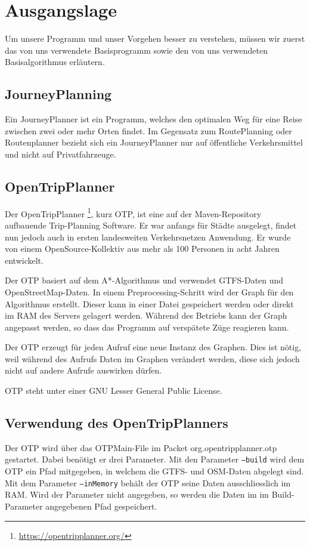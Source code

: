 \section{Ausgangslage}
Um unsere Programm und unser Vorgehen besser zu verstehen, müssen wir zuerst das von uns verwendete Basisprogramm sowie den von uns verwendeten Basisalgorithmus erläutern.

\subsection{JourneyPlanning}
Ein \hypertarget{JourneyPlanner}{JourneyPlanner} ist ein Programm, welches den optimalen Weg für eine Reise zwischen zwei oder mehr Orten findet. Im Gegensatz zum RoutePlanning oder Routenplanner bezieht sich ein JourneyPlanner nur auf öffentliche Verkehrsmittel und nicht auf Privatfahrzeuge.

\subsection{OpenTripPlanner}

Der \hypertarget{OTP}{OpenTripPlanner} \cite{otp}\footnote{\url{https://opentripplanner.org/}}, kurz OTP, ist eine auf der \gls{Maven-Repository} 
aufbauende Trip-Planning Software. Er war anfangs für Städte ausgelegt, findet nun jedoch auch in ersten landesweiten Verkehrsnetzen Anwendung. Er wurde von einem OpenSource-Kollektiv aus mehr als 100 Personen in acht Jahren entwickelt. \newline

Der OTP basiert auf dem A*-Algorithmus und verwendet GTFS-Daten und OpenStreetMap-Daten. In einem Preprocessing-Schritt wird der Graph für den Algorithmus erstellt. Dieser kann in einer Datei gespeichert werden oder direkt im RAM des Servers gelagert werden. Während des Betriebs kann der Graph angepasst werden, so dass das Programm auf verspätete Züge reagieren kann. \newline

Der OTP erzeugt für jeden Aufruf eine neue Instanz des Graphen. Dies ist nötig, weil während des Aufrufs Daten im Graphen verändert werden, diese sich jedoch nicht auf andere Aufrufe auswirken dürfen.

OTP steht unter einer \gls{GNU Lesser General Public License}. 


\subsection{Verwendung des OpenTripPlanners}
Der OTP wird über das OTPMain-File im Packet org.opentripplanner.otp gestartet. Dabei benötigt er drei Parameter. Mit den Parameter \texttt{--build} wird dem OTP ein Pfad mitgegeben, in welchem die GTFS- und OSM-Daten abgelegt sind. Mit dem Parameter \texttt{--inMemory} behält der OTP seine Daten ausschliesslich im RAM. Wird der Parameter nicht angegeben, so werden die Daten im im Build-Parameter angegebenen Pfad gespeichert. \newline

